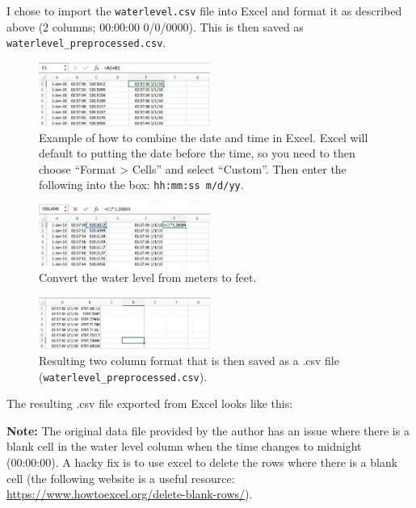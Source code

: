 \documentclass[11pt]{article}
\begin{document}
I chose to import the \texttt{waterlevel.csv} file into Excel and format it as
described above (2 columns; 00:00:00 0/0/0000). This is then saved as
\texttt{waterlevel\_preprocessed.csv}.

\begin{figure}[ht]
    \centering
    \includegraphics[width=0.5\textwidth]{../figs/howto/excel1.png}
    \caption{Example of how to combine the date and time in Excel. Excel will
    default to putting the date before the time, so you need to then choose
“Format > Cells” and select “Custom”. Then enter the following into the box:
\texttt{hh:mm:ss m/d/yy}.}
\end{figure}
\begin{figure}[ht]
    \centering
    \includegraphics[width=0.5\textwidth]{../figs/howto/excel2.png}
    \caption{Convert the water level from meters to feet.}
\end{figure}
\begin{figure}[ht!]
    \centering
    \includegraphics[width=0.5\textwidth]{../figs/howto/excel3.png}
    \caption{Resulting two column format that is then saved as a .csv file
    (\texttt{waterlevel\_preprocessed.csv}).}
\end{figure}

The resulting .csv file exported from Excel looks like this:



\textbf{Note:} The original data file provided by the author has an issue where
there is a blank cell in the water level column when the time changes to
midnight (00:00:00). A hacky fix is to use excel to delete the rows where there
is a blank cell (the following website is a useful resource:
\url{https://www.howtoexcel.org/delete-blank-rows/}).
\end{document}
